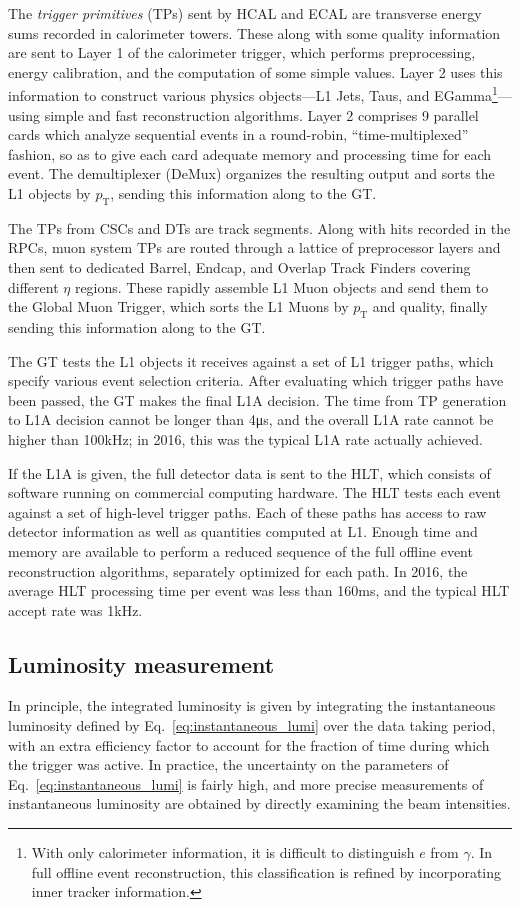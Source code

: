 \documentclass[oneside, letterpaper, 12pt, oldfontcommands]{memoir}
\begin{document}
The \textit{trigger primitives} (TPs) sent by HCAL and ECAL are transverse energy sums recorded in calorimeter towers.
These along with some quality information are sent to Layer 1 of the calorimeter trigger,
which performs preprocessing, energy calibration, and the computation of some simple values. Layer 2 uses this information to construct
various physics objects---L1 Jets, Taus, and EGamma\footnote{With only calorimeter information, it is difficult to distinguish $e$ from $\gamma$.
In full offline event reconstruction, this classification is refined by incorporating inner tracker information.}---using simple and fast reconstruction algorithms.
Layer 2 comprises 9 parallel cards which analyze sequential events in a round-robin, ``time-multiplexed'' fashion, so as to give
each card adequate memory and processing time for each event. The demultiplexer (DeMux) organizes the resulting output and sorts the L1 objects by $p_\mathrm{T}$,
sending this information along to the GT.

The TPs from CSCs and DTs are track segments. Along with hits recorded in the RPCs, muon system TPs are routed through a lattice of preprocessor
layers and then sent to dedicated Barrel, Endcap, and Overlap Track Finders covering different $\eta$ regions.
These rapidly assemble L1 Muon objects and send them to the Global Muon Trigger,
which sorts the L1 Muons by $p_\mathrm{T}$ and quality, finally sending this information along to the GT.

The GT tests the L1 objects it receives against a set of L1 trigger paths, which specify various event selection criteria. After evaluating
which trigger paths have been passed, the GT makes the final L1A decision. The time from TP generation to L1A decision cannot be longer than
4\unit{\micro s}, and the overall L1A rate cannot be higher than 100\unit{kHz}; in 2016, this was the typical L1A rate actually achieved.

If the L1A is given, the full detector data is sent to the HLT, which consists of software running on commercial computing hardware.
The HLT tests each event against a set of high-level trigger paths. Each of these paths has access to raw detector information as well
as quantities computed at L1. Enough time and memory are available to perform a reduced sequence of the full offline event reconstruction
algorithms, separately optimized for each path. In 2016, the average HLT processing time per event was less than 160\unit{ms},
and the typical HLT accept rate was 1\unit{kHz}.

\subsection{Luminosity measurement} \label{sec:LHCCMS_CMS_lumi}
In principle, the integrated luminosity is given by integrating the instantaneous luminosity defined by Eq.~\ref{eq:instantaneous_lumi} over the data taking period,
with an extra efficiency factor to account for the fraction of time during which the trigger was active. In practice, the uncertainty on the
parameters of Eq.~\ref{eq:instantaneous_lumi} is fairly high, and more precise measurements of instantaneous luminosity are obtained by directly examining the beam intensities.
\end{document}
